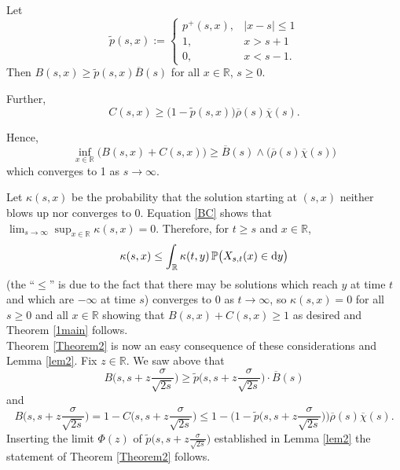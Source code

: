 \documentclass[sn-mathphys-num]{sn-jnl}
\theoremstyle{definition}
\newcommand{\scr}[1]{\mathscr #1}
\numberwithin{equation}{section} \theoremstyle{remark}
\renewcommand{\d}{\hbox{d}}
\def\R{\mathbb R}
\def\d{\text{\rm{d}}} \def\bb{\beta} \def\aa{\alpha} \def\D{\scr D}
\def\P{\mathbb P}
\newcommand{\1}{\mathbbm{1}}
\renewcommand{\bar}{\overline}
\renewcommand{\tilde}{\widetilde}
\begin{document}
      Let $$\tilde p(s,x):=\left\{\begin{array}{ll}p^+(s,x), &|x-s|\leq 1\\
                                    1, &x>s+1\\
                                    0, &x<
                                         s-1.
                                   \end{array} \right.
                                 $$
                                 Then $B(s,x)\geq \tilde p(s,x)\bar B(s)$ for all $x \in \R$, $s \geq 0$.

                                 Further,
               $$C(s,x) \geq \big(1-\tilde p(s,x)\big) \bar \rho(s)\bar \chi(s).$$

        Hence,
        \begin{equation}\label{BC}
          \inf_{x \in \R}\Big(B(s,x)+C(s,x)\Big)\geq \bar B(s)\wedge\big(\bar \rho(s)\bar\chi(s)\big)
          \end{equation}
      which converges to 1 as $s \to \infty$.

      Let $\kappa(s,x)$ be the probability that the solution starting at $(s,x)$ neither blows up nor converges to 0. Equation \eqref{BC} shows that $\lim_{s \to \infty}\sup_{x \in \R}\kappa(s,x)=0$.
      Therefore, for $t\geq s$ and $x \in \R$,
      \begin{equation}\label{kappe}
\kappa(s,x)\leq\int_\R \kappa(t,y)\,\P\big(X_{s,t}(x)\in\d y\big)
\end{equation}
(the ``$\leq$'' is due to the fact that there may be solutions which reach $y$ at time $t$ and which are $-\infty$ at time $s$) converges to 0 as $t \to \infty$, so $\kappa(s,x)=0$ for all $s \geq 0$ and all $x \in \R$ showing that $B(s,x)+C(s,x)\geq 1$ as desired and Theorem \ref{1main} follows.\\


Theorem \ref{Theorem2} is now an easy consequence of these considerations and Lemma \ref{lem2}. Fix $z \in \R$. We saw above that
$$
B\Big(s,s+z\frac \sigma {\sqrt{2s}}\Big)\geq \tilde p\Big(s,s+z\frac \sigma {\sqrt{2s}}\Big)\cdot \bar B(s)
$$
and
$$
B\Big(s,s+z\frac \sigma {\sqrt{2s}}\Big)=1-C\Big(s,s+z\frac \sigma {\sqrt{2s}}\Big)\leq 1-\Big(1-\tilde  p\Big(s,s+z\frac \sigma {\sqrt{2s}}\Big)\Big)\bar \rho(s)\bar \chi(s).
$$
Inserting the limit $\Phi(z)$ of $\tilde  p\Big(s,s+z\frac \sigma {\sqrt{2s}}\Big)$ established in Lemma \ref{lem2} the statement  of Theorem \ref{Theorem2} follows.\\
\end{document}
